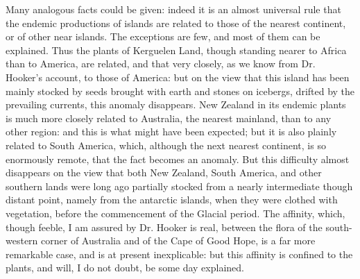 \indent Many analogous facts could be given: indeed it is an almost universal rule that the endemic productions of islands are related to those of the nearest continent, or of other near islands. The exceptions are few, and most of them can be explained. Thus the plants of Kerguelen Land, though standing nearer to Africa than to America, are related, and that very closely, as we know from Dr. Hooker's account, to those of America: but on the view that this island has been mainly stocked by seeds brought with earth and stones on icebergs, drifted by the prevailing currents, this anomaly disappears.  New Zealand in its endemic plants is much more closely related to Australia, the nearest mainland, than to any other region: and this is what might have been expected; but it is also plainly related to South America, which, although the next nearest continent, is so enormously remote, that the fact becomes an anomaly. But this difficulty almost disappears on the view that both New Zealand, South America, and other southern lands were long ago partially stocked from a nearly intermediate though distant point, namely from the antarctic islands, when they were clothed with vegetation, before the commencement of the Glacial period.  The affinity, which, though feeble, I am assured by Dr. Hooker is real, between the flora of the south-western corner of Australia and of the Cape of Good Hope, is a far more remarkable case, and is at present inexplicable: but this affinity is confined to the plants, and will, I do not doubt, be some day explained.~\\
